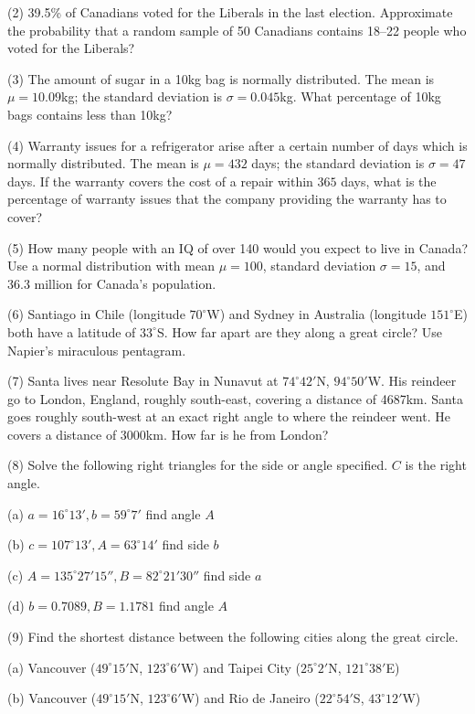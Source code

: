 \documentclass[11pt]{article}
\begin{document}
(2) 39.5\% of Canadians voted for the Liberals in the last election.
Approximate the probability that a random sample of 50 Canadians
contains 18--22 people who voted for the Liberals?

(3) The amount of sugar in a 10kg bag is normally distributed. The
mean is $\mu=10.09$kg; the standard deviation is $\sigma=0.045$kg.
What percentage of 10kg bags contains less than 10kg?

(4) Warranty issues for a refrigerator arise after a certain number of
days which is normally distributed. The mean is $\mu=432$ days; the
standard deviation is $\sigma=47$ days. If the warranty covers the
cost of a repair within $365$ days, what is the percentage of warranty
issues that the company providing the warranty has to cover?

(5) How many people with an IQ of over 140 would you expect to live in
Canada? Use a normal distribution with mean $\mu=100$, standard
deviation $\sigma=15$, and 36.3 million for Canada's population.

(6) Santiago in Chile (longitude $70^{\circ}$W) and Sydney in
Australia (longitude $151^{\circ}$E) both have a latitude of
$33^{\circ}$S. How far apart are they along a great circle? Use
Napier's miraculous pentagram.

(7) Santa lives near Resolute Bay in Nunavut at $74^{\circ}42'$N,
$94^{\circ}50'$W. His reindeer go to London, England, roughly
south-east, covering a distance of 4687km. Santa goes roughly
south-west at an exact right angle to where the reindeer went. He
covers a distance of 3000km. How far is he from London?

(8) Solve the following right triangles for the side or angle
specified. $C$ is the right angle.

(a) $a=16^{\circ}13',b=59^{\circ}7'$ find angle $A$

(b) $c=107^{\circ}13',A=63^{\circ}14'$ find side $b$

(c) $A=135^{\circ}27'15'',B=82^{\circ}21'30''$ find side $a$

(d) $b=0.7089,B=1.1781$ find angle $A$

(9) Find the shortest distance between the following cities along the
great circle.

(a) Vancouver ($49^{\circ}15'$N, $123^{\circ}6'$W) and Taipei City
($25^{\circ}2'$N, $121^{\circ}38'$E)

(b) Vancouver ($49^{\circ}15'$N, $123^{\circ}6'$W) and Rio de Janeiro
($22^{\circ}54'$S, $43^{\circ}12'$W)
\end{document}
